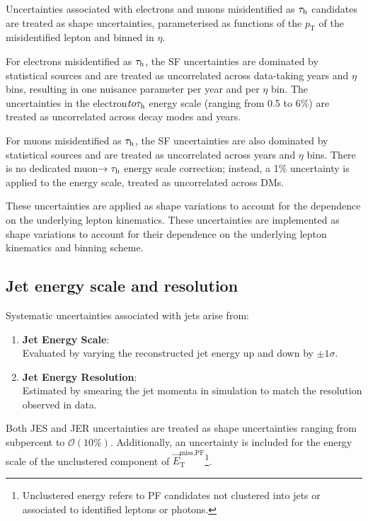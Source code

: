 Uncertainties associated with electrons and muons misidentified as $\tau_\mathrm{h}$ candidates are treated as shape uncertainties, parameterised as functions of the $p_{\text{T}}$ of the misidentified lepton and binned in $\eta$.

For electrons misidentified as $\tau_\mathrm{h}$, the SF uncertainties are dominated by statistical sources and are treated as uncorrelated across data-taking years and $\eta$ bins, resulting in one nuisance parameter per year and per $\eta$ bin. The uncertainties in the electron$to\tau_\mathrm{h}$ energy scale (ranging from 0.5 to 6\%) are treated as uncorrelated across decay modes and years.

For muons misidentified as $\tau_\mathrm{h}$, the SF uncertainties are also dominated by statistical sources and are treated as uncorrelated across years and $\eta$ bins. There is no dedicated muon$\rightarrow\tau_\mathrm{h}$ energy scale correction; instead, a 1\% uncertainty is applied to the energy scale, treated as uncorrelated across DMs.

These uncertainties are applied as shape variations to account for the dependence on the underlying lepton kinematics. These uncertainties are implemented as shape variations to account for their dependence on the underlying lepton kinematics and binning scheme.

\subsection{Jet energy scale and resolution}

Systematic uncertainties associated with jets arise from:
\begin{enumerate}[label=(\roman*)]

\item \textbf{Jet Energy Scale}: \\
Evaluated by varying the reconstructed jet energy up and down by $\pm1\sigma$.

\item \textbf{Jet Energy Resolution}: \\
Estimated by smearing the jet momenta in simulation to match the resolution observed in data.

\end{enumerate}

Both JES and JER uncertainties are treated as shape uncertainties ranging from subpercent to $\mathcal{O}(10\%)$. Additionally, an uncertainty is included for the energy scale of the unclustered component of $\vec{E}_\mathrm{T}^{\text{miss,PF}}$\footnote{Unclustered energy refers to PF candidates not clustered into jets or associated to identified leptons or photons.}.

